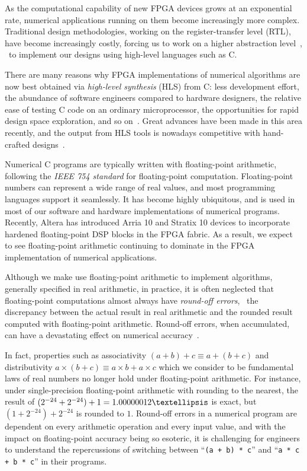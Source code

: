 As the computational capability of new FPGA devices grows at an exponential
rate, numerical applications running on them become increasingly more complex.
Traditional design methodologies, working on the register-transfer level (RTL),
have become increasingly costly, forcing us to work on a higher abstraction
level~\cite{gajski}, \ie~to implement our designs using high-level languages
such as C\@.

There are many reasons why FPGA implementations of numerical algorithms
are now best obtained via \emph{high-level synthesis} (HLS) from C\@:
less development effort, the abundance of software engineers compared to
hardware designers, the relative ease of testing C code on an ordinary
microprocessor, the opportunities for rapid design space exploration, and
so on~\cite{meeus12}. Great advances have been made in this area recently,
and the output from HLS tools is nowadays competitive with hand-crafted
designs~\cite{bdti_xilinx}.

Numerical C programs are typically written with floating-point arithmetic,
following the \emph{IEEE 754 standard} for floating-point computation.
Floating-point numbers can represent a wide range of real values, and most
programming languages support it seamlessly.  It has become highly ubiquitous,
and is used in most of our software and hardware implementations of numerical
programs.  Recently, Altera has introduced Arria 10 and Stratix 10 devices
to incorporate hardened floating-point DSP blocks in the FPGA fabric.  As a
result, we expect to see floating-point arithmetic continuing to dominate in
the FPGA implementation of numerical applications.

Although we make use floating-point arithmetic to implement algorithms,
generally specified in real arithmetic, in practice, it is often neglected that
floating-point computations almost always have \emph{round-off errors}, \ie~the
discrepancy between the actual result in real arithmetic and the rounded result
computed with floating-point arithmetic.  Round-off errors, when accumulated,
can have a devastating effect on numerical accuracy~\cite{higham02}.

In fact, properties such as associativity $(a + b) + c \equiv a + (b + c)$
and distributivity $a \times (b + c) \equiv a \times b + a \times c$ which
we consider to be fundamental laws of real numbers no longer hold under
floating-point arithmetic.  For instance, under single-precision floating-point
arithmetic with rounding to the nearest, the result of $(2^{-24} + 2^{-24})
+ 1 = 1.00000012\textellipsis$ is exact, but $(1 + 2^{-24}) + 2^{-24}$ is
rounded to $1$.  Round-off errors in a numerical program are dependent on
every arithmetic operation and every input value, and with the impact on
floating-point accuracy being so esoteric, it is challenging for engineers to
understand the repercussions of switching between ``\verb|(a + b) * c|'' and
``\verb|a * c + b * c|'' in their programs.

